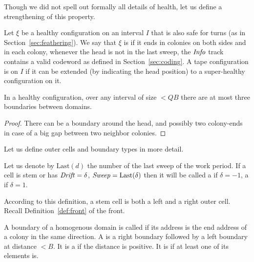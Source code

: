 \documentclass[11pt]{memoir}
\theoremstyle{definition} %
\newcommand{\fld}[1]{\ensuremath{\textit{#1\/}}}
\def\B{B}
\newcommand{\Q}{Q} %
\newcommand{\Last}{\mathrm{Last}}
\newcommand{\Drift}{\fld{Drift}}
\newcommand{\Info}{\fld{Info}}
\newcommand{\Sweep}{\fld{Sweep}} %
\begin{document}
Though we did not spell out formally all details of health, let us define a strengthening of this property.

\begin{definition}\label{def:super-health}
  Let \( \xi  \) be a healthy configuration on an interval \( I \) that is also safe for turns
  (as in Section~\ref{sec:feathering}).
  We say that \( \xi \) is  if it ends in colonies on both sides and
  in each colony, whenever the head is not in the last sweep, the \( \Info \)
  track contains a valid codeword as defined in Section~\ref{sec:coding}.
  A tape configuration is  on \( I \)
  if it can be extended (by indicating the head position) to a super-healthy configuration on it.
\end{definition}

\begin{lemma}\label{lem:3-boundaries}
  In a healthy configuration, over any interval of size \( <\Q\B \) there are at most three boundaries between
  domains.
\end{lemma}
\begin{proof}
  There can be a boundary around the head, and possibly two colony-ends in case of a big gap between
  two neighbor colonies.  
\end{proof}

Let us define outer cells and boundary types in more detail.

\begin{definition}\label{def:outer-cells}
Let us denote by \( \Last(d) \) the number of the last sweep of the work period.
If a cell is stem or has \( \Drift = \delta \),  \( \Sweep = \Last(\delta) \)
    then it will be called a  if
    \( \delta = -1 \), a  if \( \delta = 1 \).
\end{definition}

According to this definition, a stem cell is both a left and a right outer cell.
Recall Definition~\ref{def:front} of the front.


\begin{definition}[Boundaries]%

A boundary of a homogenous domain is called  if its address is the end 
address of a colony in the same direction.
A  
is a right boundary followed by a left boundary at distance \( <\B \).
It is a  if the distance is positive.
It is  if at least one of its elements is.
\end{definition}
\end{document}
